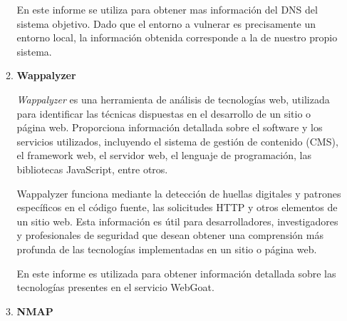\documentclass[12pt,oneside,a4paper]{book}
\begin{document}
\begin{enumerate}
\begin{enumerate}
        \vspace{1em}

        \hspace{20pt}
        En este informe se utiliza para obtener mas información del DNS del sistema objetivo. Dado que el entorno a vulnerar es precisamente un entorno local, la información obtenida corresponde a la de nuestro propio sistema.
        
        \vspace{2em}

        \item{\textbf{Wappalyzer}}

        \vspace{1em}

        \hspace{20pt}
        \textit{Wappalyzer} es una herramienta de análisis de tecnologías web, utilizada para identificar las técnicas dispuestas en el desarrollo de un sitio o página web. Proporciona información detallada sobre el software y los servicios utilizados, incluyendo el sistema de gestión de contenido (CMS), el framework web, el servidor web, el lenguaje de programación, las bibliotecas JavaScript, entre otros.
        
        \vspace{1em}
        
        \hspace{20pt}
        Wappalyzer funciona mediante la detección de huellas digitales y patrones específicos en el código fuente, las solicitudes HTTP y otros elementos de un sitio web. Esta información es útil para desarrolladores, investigadores y profesionales de seguridad que desean obtener una comprensión más profunda de las tecnologías implementadas en un sitio o página web.

        \vspace{1em}

        \hspace{20pt}
        En este informe es utilizada para obtener información detallada sobre las tecnologías presentes en el servicio WebGoat.

        \vspace{2em}

        \item{\textbf{NMAP}}

        \vspace{1em}


\end{enumerate}
\end{enumerate}
\end{document}
